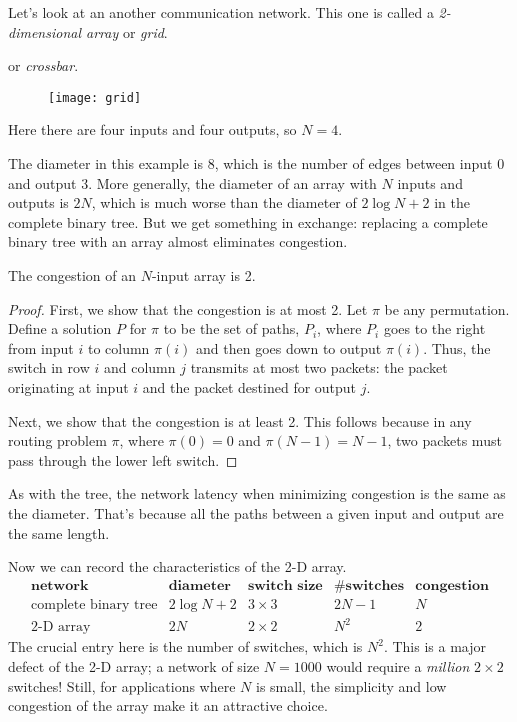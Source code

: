 \label{2Darray}

Let's look at an another communication network.  This one is called a
\emph{2-dimensional array}%
or \emph{grid}.

\begin{editingnotes}
or \emph{crossbar}.
\end{editingnotes}
\begin{figure}
\texttt{[image: grid]}
\end{figure}
Here there are four inputs and four outputs, so $N = 4$.

The diameter in this example is 8, which is the number of edges
between input 0 and output 3.  More generally, the diameter of an
array with $N$ inputs and outputs is $2N$, which is much worse than
the diameter of $2 \log N + 2$ in the complete binary tree.  But we
get something in exchange: replacing a complete binary tree with an
array almost eliminates congestion.

\begin{theorem}
The congestion of an $N$-input array is 2.
\end{theorem}

\begin{proof}
First, we show that the congestion is at most 2.  Let $\pi$ be any
permutation.  Define a solution $P$ for $\pi$ to be the set of paths,
$P_i$, where $P_i$ goes to the right from input $i$ to column $\pi(i)$ and
then goes down to output $\pi(i)$.  Thus, the switch in row $i$ and column
$j$ transmits at most two packets: the packet originating at input
$i$ and the packet destined for output $j$.

Next, we show that the congestion is at least 2.  This follows because in
any routing problem $\pi$, where $\pi(0) = 0$ and $\pi(N-1) =
N-1$, two packets must pass through the lower left switch.
\end{proof}

As with the tree, the network latency when minimizing congestion is the
same as the diameter.  That's because all the paths between a given input
and output are the same length.

Now we can record the characteristics of the 2-D array.
%
\[
\begin{array}{r|c|c|c|c}
\textbf{network} &
\textbf{diameter} &
\textbf{switch size} &
\textbf{\# switches} &
\textbf{congestion} \\ \hline
\text{complete binary tree} & 2 \log N + 2 & 3 \times 3 & 2N - 1 & N \\
\text{2-D array} & 2 N & 2 \times 2 & N^2 & 2
\end{array}
\]
%
The crucial entry here is the number of switches, which is $N^2$.
This is a major defect of the 2-D array; a network of size $N = 1000$
would require a \textit{million} $2 \times 2$ switches!  Still, for
applications where $N$ is small, the simplicity and low congestion of
the array make it an attractive choice.


